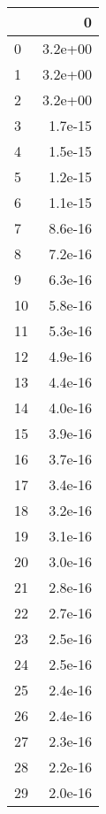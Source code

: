 \begin{tabular}{lr}
\toprule
{} &       0 \\
\midrule
0  & 3.2e+00 \\
1  & 3.2e+00 \\
2  & 3.2e+00 \\
3  & 1.7e-15 \\
4  & 1.5e-15 \\
5  & 1.2e-15 \\
6  & 1.1e-15 \\
7  & 8.6e-16 \\
8  & 7.2e-16 \\
9  & 6.3e-16 \\
10 & 5.8e-16 \\
11 & 5.3e-16 \\
12 & 4.9e-16 \\
13 & 4.4e-16 \\
14 & 4.0e-16 \\
15 & 3.9e-16 \\
16 & 3.7e-16 \\
17 & 3.4e-16 \\
18 & 3.2e-16 \\
19 & 3.1e-16 \\
20 & 3.0e-16 \\
21 & 2.8e-16 \\
22 & 2.7e-16 \\
23 & 2.5e-16 \\
24 & 2.5e-16 \\
25 & 2.4e-16 \\
26 & 2.4e-16 \\
27 & 2.3e-16 \\
28 & 2.2e-16 \\
29 & 2.0e-16 \\
\bottomrule
\end{tabular}

